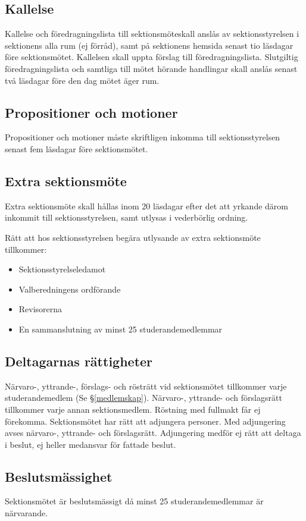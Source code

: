 \documentclass{datateknologsektionen-document}
\begin{document}
    \subsection{Kallelse}
      Kallelse och föredragningslista till sektionsmöteskall anslås av sektionsstyrelsen i
      sektionens alla rum (ej förråd), samt på sektionens hemsida senast tio läsdagar före
      sektionsmötet. Kallelsen skall uppta förslag till föredragningslista. Slutgiltig
      föredragningslista och samtliga till mötet hörande handlingar skall anslås senast två
      läsdagar före den dag mötet äger rum.
    \subsection{Propositioner och motioner}
      Propositioner och motioner måste skriftligen inkomma till sektionsstyrelsen senast fem
      läsdagar före sektionsmötet.
    \subsection{Extra sektionsmöte}
      Extra sektionsmöte skall hållas inom 20 läsdagar efter det att yrkande därom inkommit
      till sektionsstyrelsen, samt utlysas i vederbörlig ordning.

      Rätt att hos sektionsstyrelsen begära utlysande av extra sektionsmöte tillkommer:
      \begin{itemize}
        \item Sektionsstyrelseledamot
        \item Valberedningens ordförande
        \item Revisorerna
        \item En sammanslutning av minst 25 studerandemedlemmar
      \end{itemize}
      
    \subsection{Deltagarnas rättigheter}
      Närvaro-, yttrande-, förslags- och rösträtt vid sektionsmötet tillkommer varje
      studerandemedlem (Se \S \ref{medlemskap}). Närvaro-, yttrande- och förslagsrätt tillkommer varje annan
      sektionsmedlem. Röstning med fullmakt får ej förekomma. Sektionsmötet har rätt att
      adjungera personer. Med adjungering avses närvaro-, yttrande- och förslagsrätt.
      Adjungering medför ej rätt att deltaga i beslut, ej heller medansvar för fattade beslut.
    \subsection{Beslutsmässighet}
      Sektionsmötet är beslutsmässigt då minst 25 studerandemedlemmar är närvarande.
\end{document}
